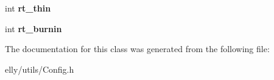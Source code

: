 \begin{DoxyCompactItemize}
\item 
\hypertarget{classelly_1_1utils_1_1_config_af8e2b3444f941fb2ce515d482c878cdb}{int {\bfseries rt\-\_\-thin}}\label{classelly_1_1utils_1_1_config_af8e2b3444f941fb2ce515d482c878cdb}

\item 
\hypertarget{classelly_1_1utils_1_1_config_a67b49ce8af417483360a6f0b8bb06a75}{int {\bfseries rt\-\_\-burnin}}\label{classelly_1_1utils_1_1_config_a67b49ce8af417483360a6f0b8bb06a75}

\end{DoxyCompactItemize}


The documentation for this class was generated from the following file\-:\begin{DoxyCompactItemize}
\item 
elly/utils/Config.\-h\end{DoxyCompactItemize}
